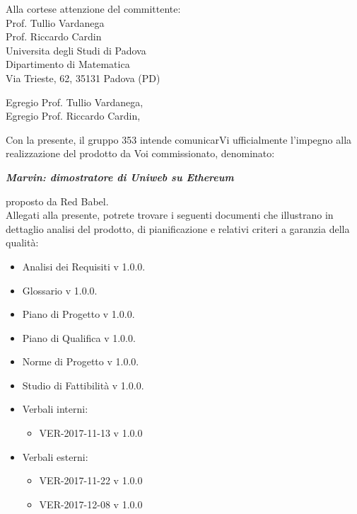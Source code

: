 \documentclass[openany, a4paper, 12pt]{letter}
\begin{document}
	
	\begin{letter}{
			Alla cortese attenzione del committente:\\
			\smallskip
			Prof. Tullio Vardanega\\
			Prof. Riccardo Cardin\\
			\medskip
			Universita degli Studi di Padova \\
			Dipartimento di Matematica\\
			Via Trieste, 62, 35131 Padova (PD)}
			\opening{Egregio Prof. Tullio Vardanega, \\
				Egregio Prof. Riccardo Cardin,}
			Con la presente, il gruppo 353 intende comunicarVi ufficialmente l’impegno alla realizzazione del
			prodotto da Voi commissionato, denominato: \\
			\begin{center}
			\emph{\textbf{Marvin: dimostratore di Uniweb su Ethereum}}\medskip \\
			\end{center}
			proposto da Red Babel.\medskip\\
			Allegati alla presente, potrete trovare i seguenti documenti che illustrano in dettaglio analisi del
			prodotto, di pianificazione e relativi criteri a garanzia della qualità: 
			\begin{itemize}
				\item Analisi dei Requisiti v 1.0.0.
				\item Glossario v 1.0.0.
				\item Piano di Progetto v 1.0.0.
				\item Piano di Qualifica v 1.0.0.
				\item Norme di Progetto v 1.0.0.
				\item Studio di Fattibilità v 1.0.0.
				\item Verbali interni:
					\begin{itemize}
						\item VER-2017-11-13 v 1.0.0
					\end{itemize}
				\item Verbali esterni:
					\begin{itemize}
						\item VER-2017-11-22 v 1.0.0
						\item VER-2017-12-08 v 1.0.0
					\end{itemize}				
				\end{itemize}
			
			\thispagestyle{firstpage}


\end{letter}
\end{document}
